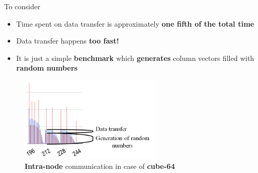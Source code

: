 \begin{frame}[t]{To consider}
    \justifying
    \small
    \begin{itemize}
        \item Time spent on data transfer is approximately \textbf{one fifth of the total time}
        \item Data transfer happens \textbf{too fast!}
        \item It is just a simple \textbf{benchmark} which \textbf{generates} column vectors filled with \textbf{random numbers}
    \end{itemize}
    
    \begin{figure}[htpb]
        \centering
        \includegraphics[width=0.6\textwidth]{figures/chapter-3/fast-data-transfer.png}
        \caption{\textbf{Intra-node} communication in case of \textbf{cube-64}}
    \end{figure}

\end{frame}
\fi